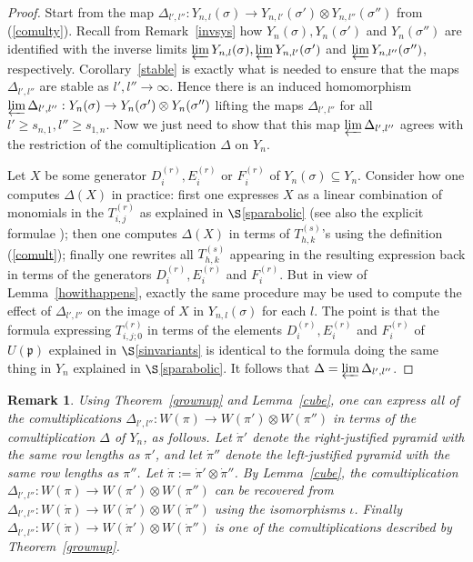 \documentclass[twoside,12pt,reqno]{amsart}
\newtheorem{Remark}[Proposition]{Remark}
\begin{document}
\begin{proof}
Start from the map $\Delta_{l',l''}:Y_{n,l}(\sigma)
\rightarrow Y_{n,l'}(\sigma') \otimes Y_{n,l''}(\sigma'')$ from
(\ref{comulty}).
Recall from Remark~\ref{invsys} how $Y_n(\sigma), Y_n(\sigma')$ and
$Y_n(\sigma'')$ are identified with the inverse limits 
$\varprojlim Y_{n,l}(\sigma), \varprojlim Y_{n,l'}(\sigma')$
and 
$\varprojlim Y_{n,l''}(\sigma'')$,
respectively. Corollary~\ref{stable} is exactly what is needed to ensure that
the maps $\Delta_{l',l''}$ are stable as $l',l'' \rightarrow \infty$.
Hence there is an induced homomorphism
$\varprojlim \Delta_{l',l''}:Y_n(\sigma) \rightarrow Y_n(\sigma') \otimes
Y_n(\sigma'')$ lifting the maps $\Delta_{l',l''}$
for all $l' \geq s_{n,1}, l'' \geq s_{1,n}$.
Now we just need to show that this map
$\varprojlim \Delta_{l',l''}$ agrees with the restriction of the comultiplication $\Delta$ on $Y_n$.

Let $X$ be some generator $D_i^{(r)}, E_i^{(r)}$ or $F_i^{(r)}$
of $Y_n(\sigma) \subseteq Y_n$.
Consider how one computes $\Delta(X)$ in practice: first one expresses
$X$ as a linear combination of monomials in the $T_{i,j}^{(r)}$ as explained
in $\S$\ref{sparabolic} (see also the explicit formulae 
\cite[(5.2)--(5.4)]{BK}); then one computes $\Delta(X)$ in terms of
$T_{h,k}^{(s)}$'s
using the definition (\ref{comult}); finally
one rewrites all $T_{h,k}^{(s)}$ appearing in the resulting expression
back in terms of the generators $D_i^{(r)}, E_i^{(r)}$ and $F_i^{(r)}$.
But in view of Lemma~\ref{howithappens}, exactly the same procedure
may be used to compute the effect of $\Delta_{l',l''}$ on the image
of $X$ in $Y_{n,l}(\sigma)$ for each $l$. The point is that 
the formula expressing $T_{i,j;0}^{(r)}$
in terms of the elements $D_i^{(r)}, E_i^{(r)}$ and $F_i^{(r)}$
of $U(\mathfrak{p})$
explained in $\S$\ref{sinvariants} is identical to the formula
doing the same thing in $Y_n$ explained in $\S$\ref{sparabolic}.
It follows that $\Delta = \varprojlim \Delta_{l',l''}$.
\end{proof}

\begin{Remark}\label{allco}\rm
Using Theorem~\ref{grownup} and Lemma~\ref{cube}, one can 
express {\em all} of the comultiplications
$\Delta_{l',l''}:W(\pi)\rightarrow W(\pi') \otimes W(\pi'')$
in terms of the comultiplication $\Delta$ of $Y_n$, as follows.
Let $\dot\pi'$ denote the right-justified pyramid with the same
row lengths as $\pi'$, and let $\dot\pi''$ denote the left-justified
pyramid with the same row lengths as $\pi''$. 
Let $\dot \pi := \dot\pi' \otimes \dot\pi''$.
By Lemma~\ref{cube},
the comultiplication $\Delta_{l',l''}:W(\pi) \rightarrow W(\pi') \otimes W(\pi'')$ can be recovered from $\Delta_{l',l''}:W(\dot\pi)
\rightarrow W(\dot\pi') \otimes W(\dot\pi'')$ using the isomorphisms
$\iota$. Finally 
$\Delta_{l',l''}:W(\dot\pi)
\rightarrow W(\dot\pi') \otimes W(\dot\pi'')$ 
is one of the comultiplications described by Theorem~\ref{grownup}.
\end{Remark}
\end{document}
